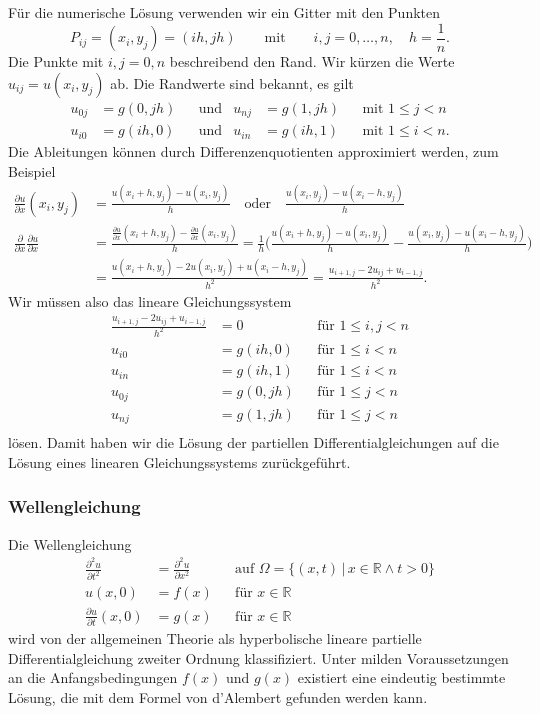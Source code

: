 Für die numerische Lösung verwenden wir ein Gitter mit den Punkten
\[
P_{ij}
=
(x_i,y_j)
=
(ih, jh)
\qquad\text{mit}\qquad
i,j=0,\dots,n,\quad
h = \frac1n.
\]
Die Punkte mit $i,j=0,n$ beschreibend den Rand.
Wir kürzen die Werte $u_{ij}=u(x_i,y_j)$ ab.
Die Randwerte sind bekannt, es gilt
\begin{align*}
u_{0j} &= g(0,jh)
&&\text{und}&
u_{nj} &= g(1,jh)
&&\text{mit $1\le j < n$}
\\
u_{i0} &= g(ih,0)
&&\text{und}&
u_{in} &= g(ih,1)
&&\text{mit $1\le i < n$.}
\end{align*}
Die Ableitungen können durch Differenzenquotienten approximiert werden,
zum Beispiel
\begin{align*}
\frac{\partial u}{\partial x}(x_i,y_j)
&=
\frac{u(x_i+h,y_j)-u(x_i,y_j)}{h}
\quad\text{oder}\quad
\frac{u(x_i,y_j)-u(x_i-h,y_j)}{h}
\\
\frac{\partial}{\partial x}
\frac{\partial u}{\partial x}
&=
\frac{\displaystyle
\frac{\partial u}{\partial x}(x_i+h,y_j)
-
\frac{\partial u}{\partial x}(x_i,y_j)
}{h}
=
\frac1h 
\biggl(
\frac{u(x_i+h,y_j) - u(x_i,y_j)}{h}
-
\frac{u(x_i,y_j) - u(x_i-h,y_j)}{h}
\biggr)
\\
&=
\frac{ u(x_i+h,y_j)-2u(x_i,y_j)+u(x_i-h,y_j) }{h^2}
=
\frac{u_{i+1,j}-2u_{ij}+u_{i-1,j}}{h^2}.
\end{align*}
Wir müssen also das lineare Gleichungssystem
\begin{equation}
\begin{aligned}
\frac{u_{i+1,j}-2u_{ij}+u_{i-1,j}}{h^2} &=0
&&\text{für $1 \le i,j< n$}
\\
u_{i0} &= g(ih, 0)&&\text{für $1\le i<n$}\\
u_{in} &= g(ih, 1)&&\text{für $1\le i<n$}\\
u_{0j} &= g(0, jh)&&\text{für $1\le j<n$}\\
u_{nj} &= g(1, jh)&&\text{für $1\le j<n$}\\
\end{aligned}
\end{equation}
lösen.
Damit haben wir die Lösung der partiellen Differentialgleichungen auf
die Lösung eines linearen Gleichungssystems zurückgeführt.

\subsubsection{Wellengleichung}
Die Wellengleichung
\[
\begin{aligned}
\frac{\partial^2u}{\partial t^2}
&=
\frac{\partial^2u}{\partial x^2}
&&\text{auf $\Omega=\{(x,t)\,|\, x\in\mathbb R\wedge t>0\}$}
\\
u(x,0)&=f(x)
&&\text{für $x\in\mathbb R$}\\
\frac{\partial u}{\partial t}(x,0)&=g(x)
&&\text{für $x\in\mathbb R$}
\end{aligned}
\]
wird von der allgemeinen Theorie \cite{skript:pde} als hyperbolische
lineare
partielle Differentialgleichung zweiter Ordnung klassifiziert.
Unter milden Voraussetzungen an die Anfangsbedingungen $f(x)$ und $g(x)$
existiert eine eindeutig bestimmte Lösung, die mit dem Formel von
d'Alembert gefunden werden kann.

